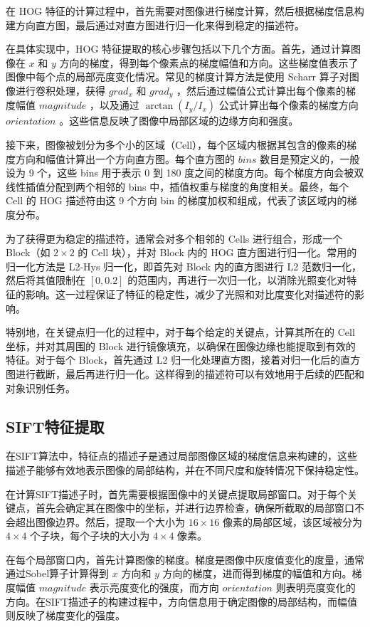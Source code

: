 \documentclass[a4paper, utf8]{ctexart}
\begin{document}
	在 HOG 特征的计算过程中，首先需要对图像进行梯度计算，然后根据梯度信息构建方向直方图，最后通过对直方图进行归一化来得到稳定的描述符。
	
	在具体实现中，HOG 特征提取的核心步骤包括以下几个方面。首先，通过计算图像在 $x$ 和 $y$ 方向的梯度，得到每个像素点的梯度幅值和方向。这些梯度值表示了图像中每个点的局部亮度变化情况。常见的梯度计算方法是使用 Scharr 算子对图像进行卷积处理，获得 $grad_x$ 和 $grad_y$ ，然后通过幅值公式计算出每个像素的梯度幅值 $magnitude$ ，以及通过 $\arctan(I_y / I_x)$ 公式计算出每个像素的梯度方向 $orientation$ 。这些信息反映了图像中局部区域的边缘方向和强度。
	
	接下来，图像被划分为多个小的区域（Cell），每个区域内根据其包含的像素的梯度方向和幅值计算出一个方向直方图。每个直方图的 $bins$ 数目是预定义的，一般设为 9 个，这些 bins 用于表示 0 到 180 度之间的梯度方向。每个梯度方向会被双线性插值分配到两个相邻的 bins 中，插值权重与梯度的角度相关。最终，每个 Cell 的 HOG 描述符由这 9 个方向 bin 的梯度加权和组成，代表了该区域内的梯度分布。
	
	为了获得更为稳定的描述符，通常会对多个相邻的 Cells 进行组合，形成一个 Block（如 $2 \times 2$ 的 Cell 块），并对 Block 内的 HOG 直方图进行归一化。常用的归一化方法是 L2-Hys 归一化，即首先对 Block 内的直方图进行 L2 范数归一化，然后将其值限制在 $[0, 0.2]$ 的范围内，再进行一次归一化，以消除光照变化对特征的影响。这一过程保证了特征的稳定性，减少了光照和对比度变化对描述符的影响。
	
	特别地，在关键点归一化的过程中，对于每个给定的关键点，计算其所在的 Cell 坐标，并对其周围的 Block 进行镜像填充，以确保在图像边缘也能提取到有效的特征。对于每个 Block，首先通过 L2 归一化处理直方图，接着对归一化后的直方图进行截断，最后再进行归一化。这样得到的描述符可以有效地用于后续的匹配和对象识别任务。
	
	\subsection{SIFT特征提取}
	
	在SIFT算法中，特征点的描述子是通过局部图像区域的梯度信息来构建的，这些描述子能够有效地表示图像的局部结构，并在不同尺度和旋转情况下保持稳定性。
	
	在计算SIFT描述子时，首先需要根据图像中的关键点提取局部窗口。对于每个关键点，首先会确定其在图像中的坐标，并进行边界检查，确保所截取的局部窗口不会超出图像边界。然后，提取一个大小为 $16 \times 16$ 像素的局部区域，该区域被分为 $4 \times 4$ 个子块，每个子块的大小为 $4 \times 4$ 像素。
	
	在每个局部窗口内，首先计算图像的梯度。梯度是图像中灰度值变化的度量，通常通过Sobel算子计算得到 $x$ 方向和 $y$ 方向的梯度，进而得到梯度的幅值和方向。梯度幅值 $magnitude$ 表示亮度变化的强度，而方向 $orientation$ 则表明亮度变化的方向。在SIFT描述子的构建过程中，方向信息用于确定图像的局部结构，而幅值则反映了梯度变化的强度。
	
\end{document}
